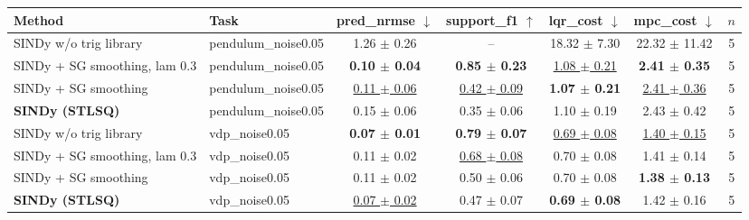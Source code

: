 \begin{tabular}{llccccc}
\toprule
Method & Task & pred\_nrmse $\downarrow$ & support\_f1 $\uparrow$ & lqr\_cost $\downarrow$ & mpc\_cost $\downarrow$ & $n$ \\
\midrule
SINDy w/o trig library & pendulum\_noise0.05 & 1.26 $\pm$ 0.26 & -- & 18.32 $\pm$ 7.30 & 22.32 $\pm$ 11.42 & 5 \\
SINDy + SG smoothing, lam 0.3 & pendulum\_noise0.05 & \textbf{0.10 $\pm$ 0.04} & \textbf{0.85 $\pm$ 0.23} & \underline{1.08 $\pm$ 0.21} & \textbf{2.41 $\pm$ 0.35} & 5 \\
SINDy + SG smoothing & pendulum\_noise0.05 & \underline{0.11 $\pm$ 0.06} & \underline{0.42 $\pm$ 0.09} & \textbf{1.07 $\pm$ 0.21} & \underline{2.41 $\pm$ 0.36} & 5 \\
\textbf{SINDy (STLSQ)} & pendulum\_noise0.05 & 0.15 $\pm$ 0.06 & 0.35 $\pm$ 0.06 & 1.10 $\pm$ 0.19 & 2.43 $\pm$ 0.42 & 5 \\
\midrule
SINDy w/o trig library & vdp\_noise0.05 & \textbf{0.07 $\pm$ 0.01} & \textbf{0.79 $\pm$ 0.07} & \underline{0.69 $\pm$ 0.08} & \underline{1.40 $\pm$ 0.15} & 5 \\
SINDy + SG smoothing, lam 0.3 & vdp\_noise0.05 & 0.11 $\pm$ 0.02 & \underline{0.68 $\pm$ 0.08} & 0.70 $\pm$ 0.08 & 1.41 $\pm$ 0.14 & 5 \\
SINDy + SG smoothing & vdp\_noise0.05 & 0.11 $\pm$ 0.02 & 0.50 $\pm$ 0.06 & 0.70 $\pm$ 0.08 & \textbf{1.38 $\pm$ 0.13} & 5 \\
\textbf{SINDy (STLSQ)} & vdp\_noise0.05 & \underline{0.07 $\pm$ 0.02} & 0.47 $\pm$ 0.07 & \textbf{0.69 $\pm$ 0.08} & 1.42 $\pm$ 0.16 & 5 \\
\bottomrule
\end{tabular}
